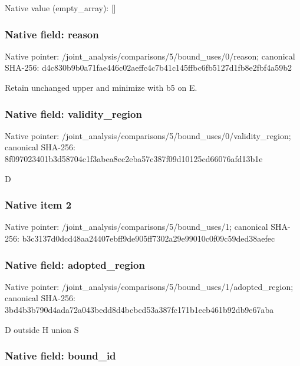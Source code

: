 \documentclass[10pt,a4paper]{article}
\begin{document}
Native value (empty\_array): []



\subsubsection{Native field: reason}


Native pointer: /joint\_analysis/comparis\allowbreak{}ons/5/bound\_uses/0/reaso\allowbreak{}n; canonical SHA-256: d4c830b9b0a71fae446c02ae\allowbreak{}ffc4c7b41c145ffbc6fb5127\allowbreak{}d1fb8e2fbf4a59b2


Retain unchanged upper and minimize with b5 on E.


\subsubsection{Native field: validity\_region}


Native pointer: /joint\_analysis/comparis\allowbreak{}ons/5/bound\_uses/0/valid\allowbreak{}ity\_region; canonical SHA-256: 8f097023401b3d58704c1f3a\allowbreak{}bea8ec2eba57c387f09d1012\allowbreak{}5cd66076afd13b1e


D


\subsubsection{Native item 2}


Native pointer: /joint\_analysis/comparis\allowbreak{}ons/5/bound\_uses/1; canonical SHA-256: b3c3137d0dcd48aa24407ebf\allowbreak{}f9de905ff7302a29e99010c0\allowbreak{}f09c59ded38aefec



\subsubsection{Native field: adopted\_region}


Native pointer: /joint\_analysis/comparis\allowbreak{}ons/5/bound\_uses/1/adopt\allowbreak{}ed\_region; canonical SHA-256: 3bd4b3b790d4ada72a043bed\allowbreak{}d8d4bcbcd53a387fc171b1ec\allowbreak{}b461b92db9e67aba


D outside H union S


\subsubsection{Native field: bound\_id}
\end{document}
